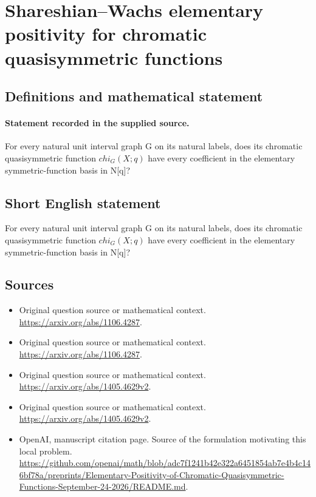 \documentclass[11pt]{article}
\begin{document}
\section*{Shareshian–Wachs elementary positivity for chromatic quasisymmetric functions}\label{30007088}
\subsection{Definitions and mathematical statement}
\paragraph{Statement recorded in the supplied source.}
For every natural unit interval graph G on its natural labels, does its chromatic quasisymmetric function $chi_G(X;q)$ have every coefficient in the elementary symmetric-function basis in N[q]?
\subsection{Short English statement}
For every natural unit interval graph G on its natural labels, does its chromatic quasisymmetric function $chi_G(X;q)$ have every coefficient in the elementary symmetric-function basis in N[q]?
\subsection{Sources}
\begin{itemize}
\item[S1] Original question source or mathematical context.
\url{https://arxiv.org/abs/1106.4287}.
\item[S2] Original question source or mathematical context.
\url{https://arxiv.org/abs/1106.4287}.
\item[S3] Original question source or mathematical context.
\url{https://arxiv.org/abs/1405.4629v2}.
\item[S4] Original question source or mathematical context.
\url{https://arxiv.org/abs/1405.4629v2}.
\item[S5] OpenAI, manuscript citation page. Source of the formulation motivating this local problem.
\url{https://github.com/openai/math/blob/adc7f1241b42e322a6451854ab7e4b4c146bf78a/preprints/Elementary-Positivity-of-Chromatic-Quasisymmetric-Functions-September-24-2026/README.md}.
\end{itemize}
\end{document}
